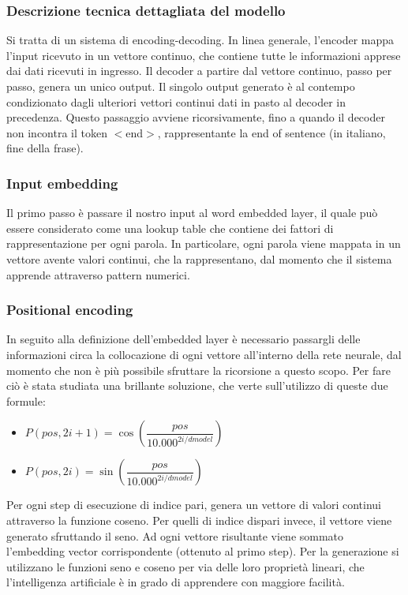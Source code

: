 \subsubsection{Descrizione tecnica dettagliata del modello}

Si tratta di un sistema di encoding-decoding. 
In linea generale, l'encoder mappa l'input ricevuto in un vettore continuo, che contiene tutte le informazioni apprese dai dati ricevuti in ingresso. Il decoder a partire dal vettore continuo, passo per passo, genera un unico output. Il singolo output generato è al contempo condizionato dagli ulteriori vettori continui dati in pasto al decoder in precedenza. Questo passaggio avviene ricorsivamente, fino a quando il decoder non incontra il token $<$end$>$, rappresentante la end of sentence (in italiano, fine della frase). 

\subsubsection{Input embedding}

Il primo passo è passare il nostro input al word embedded layer, il quale può essere considerato come una lookup table che contiene dei fattori di rappresentazione per ogni parola. In particolare, ogni parola viene mappata in un vettore avente valori continui, che la rappresentano, dal momento che il sistema apprende attraverso pattern numerici. 

\subsubsection{Positional encoding}

In seguito alla definizione dell'embedded layer è necessario passargli delle informazioni circa la collocazione di ogni vettore all'interno della rete neurale, dal momento che non è più possibile sfruttare la ricorsione a questo scopo. Per fare ciò è stata studiata una brillante soluzione, che verte sull'utilizzo di queste due formule:
\begin{itemize}
	\item $P(pos, 2i + 1) = \cos(\dfrac{pos}{10.000^{2i/dmodel}})$
	\item $P(pos, 2i) = \sin(\dfrac{pos}{10.000^{2i/dmodel}})$
\end{itemize}
Per ogni step di esecuzione di indice pari, genera un vettore di valori continui attraverso la funzione coseno. Per quelli di indice dispari invece, il vettore viene generato sfruttando il seno. Ad ogni vettore risultante viene sommato l'embedding vector corrispondente (ottenuto al primo step). Per la generazione si utilizzano le funzioni seno e coseno per via delle loro proprietà lineari, che l'intelligenza artificiale è in grado di apprendere con maggiore facilità. 

